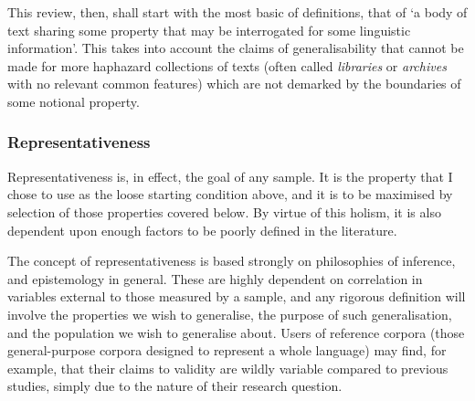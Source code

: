 
This review, then, shall start with the most basic of definitions, that of `a body of text sharing some property that may be interrogated for some linguistic information'.  This takes into account the claims of generalisability that cannot be made for more haphazard collections of texts (often called \textsl{libraries} or \textsl{archives} with no relevant common features) which are not demarked by the boundaries of some notional property.










\subsubsection{Representativeness} %
Representativeness is, in effect, the goal of any sample.  It is the property that I chose to use as the loose starting condition above, and it is to be maximised by selection of those properties covered below.  By virtue of this holism, it is also dependent upon enough factors to be poorly defined in the literature.

The concept of representativeness is based strongly on philosophies of inference, and epistemology in general.  These are highly dependent on correlation in variables external to those measured by a sample, and any rigorous definition will involve the properties we wish to generalise, the purpose of such generalisation, and the population we wish to generalise about.  Users of reference corpora (those general-purpose corpora designed to represent a whole language) may find, for example, that their claims to validity are wildly variable compared to previous studies, simply due to the nature of their research question.


